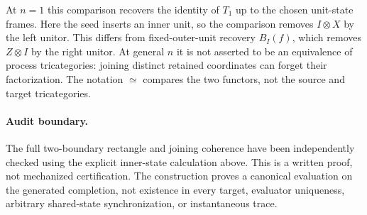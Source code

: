 \documentclass{article}
\begin{document}
At $n=1$ this comparison recovers the identity of $T_1$ up to the chosen unit-state frames. Here the seed inserts an inner unit, so the comparison removes $I\otimes X$ by the left unitor. This differs from fixed-outer-unit recovery $B_I(f)$, which removes $Z\otimes I$ by the right unitor. At general $n$ it is not asserted to be an equivalence of process tricategories: joining distinct retained coordinates can forget their factorization. The notation $\simeq$ compares the two functors, not the source and target tricategories.

\paragraph{Audit boundary.} The full two-boundary rectangle and joining coherence have been independently checked using the explicit inner-state calculation above. This is a written proof, not mechanized certification. The construction proves a canonical evaluation on the generated completion, not existence in every target, evaluator uniqueness, arbitrary shared-state synchronization, or instantaneous trace.
\end{document}
